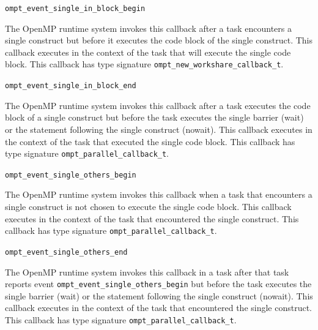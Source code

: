 \documentclass{article}
\newcommand{\descheader}[1]{{\needspace{3\baselineskip}\vspace{1em}\noindent \fbox{#1}}}
\begin{document}
\begin{description}

\item \verb|ompt_event_single_in_block_begin|
 
  The OpenMP runtime system invokes this callback after a task encounters a single construct but before it executes the code block of the single construct. This callback
  executes in the context of the task that will execute the single code block. %
  This callback has type signature \verb|ompt_new_workshare_callback_t|. 

\item \verb|ompt_event_single_in_block_end|
 
  The OpenMP runtime system invokes this callback after a task
  executes the code block of a single construct but before the
  task executes the single barrier (wait) or the statement
  following the single construct (nowait). This callback executes in
  the context of the task that executed the single code block.
  This callback has type signature \verb|ompt_parallel_callback_t|. 

\item \verb|ompt_event_single_others_begin|
 
  The OpenMP runtime system invokes this callback when 
  a task that encounters a single construct is not chosen to execute the single code block.
  This callback executes in the context of the task that encountered the single construct.
  This callback has type signature \verb|ompt_parallel_callback_t|. 

\item \verb|ompt_event_single_others_end|

 \sloppy
  The OpenMP runtime system invokes this callback in a task after that task reports event
  \verb|ompt_event_single_others_begin| but before the task
  executes the
  single barrier (wait) or the statement following the single
  construct (nowait). This callback executes in the context of the
  task that encountered the single construct.
  This callback has type signature \verb|ompt_parallel_callback_t|. 

\end{description}

\descheader{Workshares}
\end{document}
